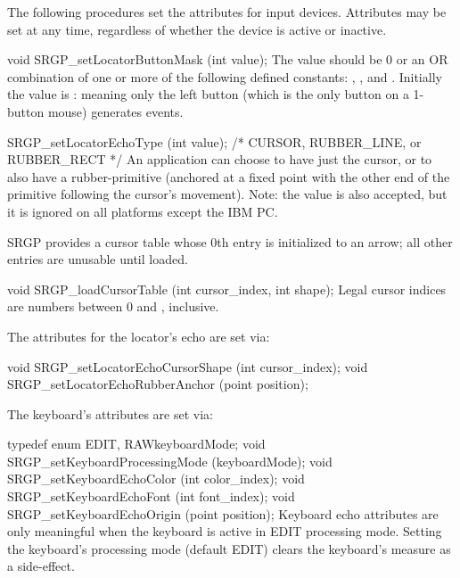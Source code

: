 The following procedures set the attributes for input devices.
Attributes may be set at any time, regardless of whether the device is
active or inactive. 

\newsynopsis
void SRGP_setLocatorButtonMask (int value);
\endsynopsis
The value should be 0 or an OR combination of one or more of the following
defined constants: , , and
.
Initially the value is :
meaning only the left button (which is the only button on a 1-button mouse) 
generates events.  

\nextsynopsis
SRGP_setLocatorEchoType (int value);  /* CURSOR, RUBBER_LINE, or RUBBER_RECT */
\endsynopsis
An application can choose to have just the cursor, or to also have a
rubber-primitive (anchored at a fixed point with the other end of the primitive
following the cursor's movement).  
Note: the value  is also accepted, 
but it is ignored on all platforms except the IBM PC.

\newpar
SRGP provides a cursor table whose 0th entry is initialized to an arrow; all
other entries are unusable until loaded.

\newsynopsis
void SRGP_loadCursorTable (int cursor_index, int shape);
\endsynopsis
Legal cursor indices are numbers between 0 and ,
inclusive.    


\newpar
The attributes for the locator's echo are set via:

\newsynopsis
void SRGP_setLocatorEchoCursorShape (int cursor_index);
void SRGP_setLocatorEchoRubberAnchor (point position);
\endsynopsis

\newpar
The keyboard's attributes are set via:

\newsynopsis
typedef enum \lb{}EDIT, RAW\rb keyboardMode;
void SRGP_setKeyboardProcessingMode (keyboardMode);
void SRGP_setKeyboardEchoColor (int color_index);
void SRGP_setKeyboardEchoFont (int font_index);
void SRGP_setKeyboardEchoOrigin (point position);
\endsynopsis
Keyboard echo attributes are only meaningful when the keyboard is
active in EDIT processing mode.  Setting the keyboard's processing mode 
(default EDIT) clears
the keyboard's measure as a side-effect.




